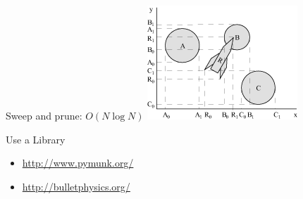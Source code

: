 \documentclass[handout,t,compress]{beamer}
\newcommand{\bframe}[1]{\begin{frame}[fragile]{#1}}
\begin{document}
\bframe{Sweep and prune: $O(N\log N)$}
\includegraphics{IGD/SweepAndPrune.png}
\end{frame}



\bframe{Use a Library}
\begin{itemize}
\item  \url{http://www.pymunk.org/}
\item \url{http://bulletphysics.org/}
\end{itemize}
\end{frame}
\end{document}
